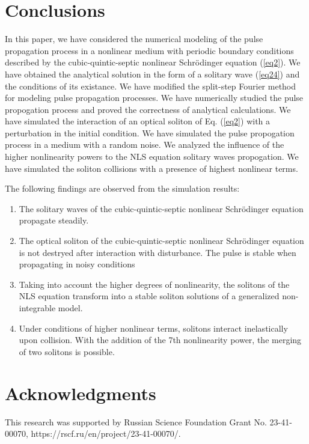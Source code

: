 \documentclass[preprint,12pt]{elsarticle}
\begin{document}
\section{Conclusions}\label{ch11}
In this paper, we have considered the numerical modeling of the pulse propagation process in a nonlinear medium with periodic boundary conditions described by the cubic-quintic-septic nonlinear Schr\"{o}dinger equation (\ref{eq2}). We have obtained the analytical solution in the form of a solitary wave (\ref{eq24}) and the conditions of its existance. We have modified the split-step Fourier method for modeling pulse propagation processes. We have numerically studied the pulse propogation process and proved the correctness of analytical calculations. We have simulated the interaction of an optical soliton of Eq. (\ref{eq2}) with a perturbation in the initial condition. We have simulated the pulse propogation process in a medium with a random noise. We analyzed the influence of the higher nonlinearity powers to the NLS equation solitary waves propogation. We have simulated the soliton collisions with a presence of highest nonlinear terms.

The following findings are observed from the simulation results:
\begin{enumerate}
  \setlength\itemsep{1em}
  \item The solitary waves of the cubic-quintic-septic nonlinear Schr\"{o}dinger equation propagate steadily.
  \item The optical soliton of the cubic-quintic-septic nonlinear Schr\"{o}dinger equation is not destryed after interaction with disturbance. The pulse is stable when propagating in noisy conditions
  \item Taking into account the higher degrees of nonlinearity, the solitons of the NLS equation transform into a stable soliton solutions of a generalized non-integrable model.
  \item Under conditions of higher nonlinear terms, solitons interact inelastically upon collision. With the addition of the 7th nonlinearity power, the merging of two solitons is possible.

\end{enumerate}

\section*{Acknowledgments}
This research was supported by Russian Science Foundation Grant No. 23-41-00070, https://rscf.ru/en/project/23-41-00070/.
\end{document}
